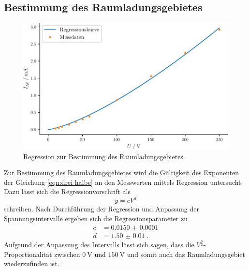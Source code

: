 \subsection{Bestimmung des Raumladungsgebietes}
\begin{figure}
    \centering
    \caption{Regression zur Bestimmung des Raumladungsgebietes}
    \label{fig:exponent}
    \includegraphics[width = \textwidth]{build/exponent.pdf}
\end{figure}
\noindent Zur Bestimmung des Raumladungsgebietes wird die Gültigkeit des Exponenten der Gleichung \eqref{eqn:drei halbe} an den Messwerten mittels Regression untersucht.
Dazu lässt sich die Regressionvorschrift als
\begin{equation}
    y = cV^d
\end{equation} 
schreiben.
Nach Durchführung der Regression und Anpassung der Spannungsintervalle ergeben sich die Regressionsparameter zu
\begin{align*}
    c & = \num{0.0150(1)} \\ 
    d & = \num{1.50(1)} \; \text{.}
\end{align*}
Aufgrund der Anpassung des Intervalls lässt sich sagen, dass die $V^\frac{3}{2}$-Proportionalität zwischen $\SI{0}{\volt}$ und $\SI{150}{\volt}$ 
und somit auch das Raumladungsgebiet wiederzufinden ist.

